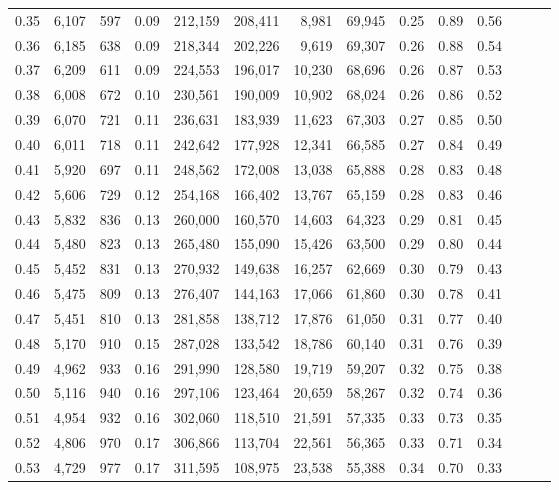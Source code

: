 \begin{tabular}{rrrrrrrrrrrrrr}
0.35 &  6,107 &    597 &  0.09 &  212,159 &  208,411 &   8,981 &  69,945 &  0.25 &  0.89 &      0.56 \\
0.36 &  6,185 &    638 &  0.09 &  218,344 &  202,226 &   9,619 &  69,307 &  0.26 &  0.88 &      0.54 \\
0.37 &  6,209 &    611 &  0.09 &  224,553 &  196,017 &  10,230 &  68,696 &  0.26 &  0.87 &      0.53 \\
0.38 &  6,008 &    672 &  0.10 &  230,561 &  190,009 &  10,902 &  68,024 &  0.26 &  0.86 &      0.52 \\
0.39 &  6,070 &    721 &  0.11 &  236,631 &  183,939 &  11,623 &  67,303 &  0.27 &  0.85 &      0.50 \\
0.40 &  6,011 &    718 &  0.11 &  242,642 &  177,928 &  12,341 &  66,585 &  0.27 &  0.84 &      0.49 \\
0.41 &  5,920 &    697 &  0.11 &  248,562 &  172,008 &  13,038 &  65,888 &  0.28 &  0.83 &      0.48 \\
0.42 &  5,606 &    729 &  0.12 &  254,168 &  166,402 &  13,767 &  65,159 &  0.28 &  0.83 &      0.46 \\
0.43 &  5,832 &    836 &  0.13 &  260,000 &  160,570 &  14,603 &  64,323 &  0.29 &  0.81 &      0.45 \\
0.44 &  5,480 &    823 &  0.13 &  265,480 &  155,090 &  15,426 &  63,500 &  0.29 &  0.80 &      0.44 \\
0.45 &  5,452 &    831 &  0.13 &  270,932 &  149,638 &  16,257 &  62,669 &  0.30 &  0.79 &      0.43 \\
0.46 &  5,475 &    809 &  0.13 &  276,407 &  144,163 &  17,066 &  61,860 &  0.30 &  0.78 &      0.41 \\
0.47 &  5,451 &    810 &  0.13 &  281,858 &  138,712 &  17,876 &  61,050 &  0.31 &  0.77 &      0.40 \\
0.48 &  5,170 &    910 &  0.15 &  287,028 &  133,542 &  18,786 &  60,140 &  0.31 &  0.76 &      0.39 \\
0.49 &  4,962 &    933 &  0.16 &  291,990 &  128,580 &  19,719 &  59,207 &  0.32 &  0.75 &      0.38 \\
0.50 &  5,116 &    940 &  0.16 &  297,106 &  123,464 &  20,659 &  58,267 &  0.32 &  0.74 &      0.36 \\
0.51 &  4,954 &    932 &  0.16 &  302,060 &  118,510 &  21,591 &  57,335 &  0.33 &  0.73 &      0.35 \\
0.52 &  4,806 &    970 &  0.17 &  306,866 &  113,704 &  22,561 &  56,365 &  0.33 &  0.71 &      0.34 \\
0.53 &  4,729 &    977 &  0.17 &  311,595 &  108,975 &  23,538 &  55,388 &  0.34 &  0.70 &      0.33 \\

\end{tabular}
